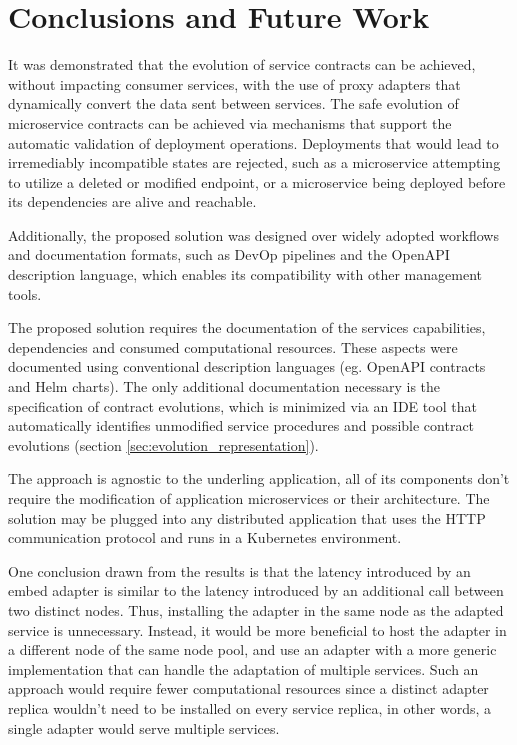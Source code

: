 
%

\chapter{Conclusions and Future Work}
\label{cha:conclusions and future work}

It was demonstrated that the evolution of service contracts can be achieved, without impacting consumer services,
with the use of proxy adapters that dynamically convert the data sent between services.
The safe evolution of microservice contracts can be achieved via mechanisms that
support the automatic validation of deployment operations.
Deployments that would lead to irremediably incompatible states are rejected, such as a
microservice attempting to utilize a deleted or modified endpoint, or a microservice being deployed before its dependencies are alive and reachable.

Additionally, the proposed solution was designed over widely adopted workflows and documentation formats, such as DevOp pipelines and the OpenAPI description language,
which enables its compatibility with other management tools.

The proposed solution requires the documentation of the services capabilities, dependencies and consumed computational resources.
These aspects were documented using conventional description languages (eg. OpenAPI contracts and Helm charts).
The only additional documentation necessary is the specification of contract evolutions, which is minimized
via an IDE tool that automatically identifies unmodified service procedures and possible contract evolutions (section \ref{sec:evolution_representation}).

The approach is agnostic to the underling application, all of its components don't require the modification of application microservices or their architecture.
The solution may be plugged into any distributed application that uses the HTTP communication protocol and runs in a Kubernetes environment.

One conclusion drawn from the results is that the latency introduced by an embed adapter is similar to the latency introduced by an additional call between two distinct nodes.
Thus, installing the adapter in the same node as the adapted service is unnecessary.
Instead, it would be more beneficial to host the adapter in a different node of the same node pool, and use an adapter with a more generic implementation that can handle the adaptation of multiple services.
Such an approach would require fewer computational resources since a distinct adapter replica wouldn't need to be installed on every service replica, in other words, a single adapter would serve multiple services.


